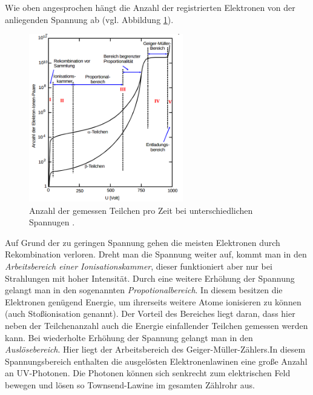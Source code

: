 Wie oben angesprochen hängt die Anzahl der registrierten
Elektronen von der anliegenden Spannung ab (vgl. Abbildung \ref{fig:teilchen_spannung}).
\begin{figure}
  \centering
  \includegraphics[width=0.6\textwidth]{bilder/diagramm.png}
  \caption{Anzahl der gemessen Teilchen pro Zeit bei unterschiedlichen Spannugen \cite{anleitung703}.} %
  \label{fig:teilchen_spannung}
\end{figure}
Auf Grund der zu geringen Spannung gehen die meisten Elektronen durch Rekombination verloren. Dreht man die Spannung weiter auf,
kommt man in den \emph{Arbeitsbereich einer Ionisationskammer}, dieser funktioniert aber nur bei
Strahlungen mit hoher Intensität. Durch eine weitere Erhöhung der Spannung gelangt man
in den sogenannten \emph{Propotionalbereich}. In diesem besitzen die Elektronen
genügend Energie, um ihrerseits weitere Atome ionisieren zu können (auch Stoßionisation genannt).
Der Vorteil des Bereiches liegt daran, dass hier neben der Teilchenanzahl auch die Energie %
einfallender Teilchen gemessen werden kann. Bei wiederholte Erhöhung der Spannung %
gelangt man in den \emph{Auslösebereich}. Hier liegt der Arbeitsbereich des
Geiger-Müller-Zählers.In diesem Spannungsbereich enthalten die ausgelösten Elektronenlawinen %
eine große Anzahl an UV-Photonen. Die Photonen können sich senkrecht zum elektrischen Feld bewegen
und lösen so Townsend-Lawine im gesamten Zählrohr aus. %

